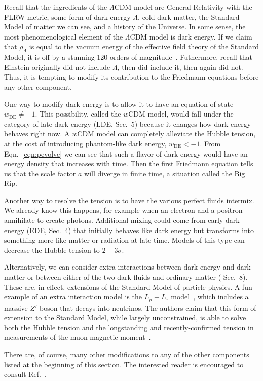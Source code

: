 \documentclass[12pt]{article}
\renewcommand{\L}{$\Lambda$}
\newcommand{\val}[1]{\cite{DiValentino2021} Sec.~#1}
\newcommand{\DE}{\text{DE}}
\begin{document}
Recall that the ingredients of the \L CDM model are General Relativity with the FLRW metric, some form of dark energy \L, cold dark matter, the Standard Model of matter we can see, and a history of the Universe. In some sense, the most phenomenological element of the \L CDM model is dark energy. If we claim that $\rho_\Lambda$ is equal to the vacuum energy of the effective field theory of the Standard Model, it is off by a stunning 120 orders of magnitude~\cite{Trodden2004}. Futhermore, recall that Einstein originally did not include $\Lambda$, then did include it, then again did not. Thus, it is tempting to modify its contribution to the Friedmann equations before any other component. 

One way to modify dark energy is to allow it to have an equation of state $w_\DE\ne-1$. This possibility, called the $w$CDM model, would fall under the category of late dark energy (LDE, \val{5}) because it changes how dark energy behaves right now. A $w$CDM model can completely alleviate the Hubble tension, at the cost of introducing phantom-like dark energy, $w_\DE<-1$. From Eqn.~\ref{eqn:pevolve} we can see that such a flavor of dark energy would have an energy density that increases with time. Then the first Friedmann equation tells us that the scale factor $a$ will diverge in finite time, a situation called the Big Rip.

Another way to resolve the tension is to have the various perfect fluids intermix. We already know this happens, for example when an electron and a positron annihilate to create photons. Additional mixing could come from early dark energy (EDE, \val{4}) that initially behaves like dark energy but transforms into something more like matter or radiation at late time. Models of this type can decrease the Hubble tension to $2-3\sigma$. 

Alternatively, we can consider extra interactions between dark energy and dark matter or between either of the two dark fluids and ordinary matter (\val{8}). These are, in effect, extensions of the Standard Model of particle physics. A fun example of an extra interaction model is the $L_\mu-L_\tau$ model~\cite{Escudero2019}, which includes a massive $Z'$ boson that decays into neutrinos. The authors claim that this form of extension to the Standard Model, while largely unconstrained, is able to solve both the Hubble tension and the longstanding and recently-confirmed tension in measurements of the muon magnetic moment~\cite{Muon2021}.

There are, of course, many other modifications to any of the other components listed at the beginning of this section. The interested reader is encouraged to consult Ref.~\cite{DiValentino2021}.
\end{document}
